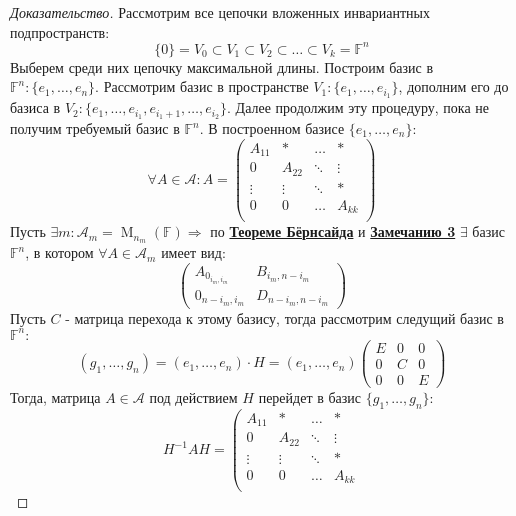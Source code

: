 \documentclass[a4paper, 14pt]{extarticle}
\theoremstyle{definition}
\begin{document}
\begin{proof}[Доказательство]
	Рассмотрим все цепочки вложенных инвариантных подпространств:
	\[\{0\} = V_0 \subset V_1 \subset V_2 \subset \dots \subset V_k = \mathbb{F}^n\]
	Выберем среди них цепочку максимальной длины. Построим базис в \(\mathbb{F}^n : \{e_1, \dots, e_n\}\).
	Рассмотрим базис в пространстве \(V_1 : \{e_1, \dots, e_{i_1}\}\), дополним его до базиса в \(V_2 : \{e_1,\dots, e_{i_1}, e_{i_1 + 1}, \dots, e_{i_2}\}\).
	Далее продолжим эту процедуру, пока не получим требуемый базис в \(\mathbb{F}^n\). В построенном базисе \(\{e_1, \dots, e_n\}:\)
	\[\forall A \in \mathcal{A}: A = \left(
	\begin{array}{c|c|c|c}
		A_{11} & * & \hdots & * \\
		\hline
		0 & A_{22} & \ddots & \vdots \\
		\hline
		\vdots & \vdots & \ddots & * \\
		\hline
		0 & 0 & \hdots & A_{kk} \\
	\end{array}
	\right)\]
	Пусть \(\exists m : \mathcal{A}_m = \operatorname{M}_{n_m}(\mathbb{F}) \Rightarrow \) по \hyperref[th2_1]{\textbf{Теореме Бёрнсайда}} и \hyperref[nt3_1]{\textbf{Замечанию 3}} \(\exists\) базис \(\mathbb{F}^n\), в котором \(\forall A \in \mathcal{A}_m\) имеет вид:
	\[\left(
		\begin{array}{c|c}
			A_{0_{i_m, i_m}} & B_{i_m, n - i_m}\\
			\hline
			0_{n - i_m, i_m} & D_{n - i_m, n - i_m}
		\end{array}
	\right)\]
	Пусть \(C\) - матрица перехода к этому базису, тогда рассмотрим следущий базис в \(\mathbb{F}^n :\)
	\[(g_1, \dots, g_n) = (e_1, \dots, e_n) \cdot H = (e_1, \dots, e_n) \left(
		\begin{array}{c|c|c}
			E & 0 & 0 \\
			\hline
			0 & C & 0 \\
			\hline
			0 & 0 & E
		\end{array}
	\right)\]
	Тогда, матрица \(A \in \mathcal{A}\) под действием \(H\) перейдет в базис \(\{g_1, \dots, g_n\}:\)
	\[H^{-1}AH = \left(
	\begin{array}{c|c|c|c}
		A_{11} & * & \hdots & * \\
		\hline
		0 & A_{22} & \ddots & \vdots \\
		\hline
		\vdots & \vdots & \ddots & * \\
		\hline
		0 & 0 & \hdots & A_{kk} \\
	\end{array}
\]
\end{proof}
\end{document}
